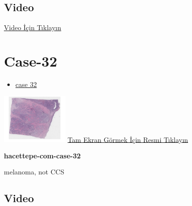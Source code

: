 \documentclass[
  letterpaper,
  DIV=11,
  numbers=noendperiod]{scrreprt}
\providecommand{\tightlist}{%
  \setlength{\itemsep}{0pt}\setlength{\parskip}{0pt}}\usepackage{longtable,booktabs,array}
\begin{document}
\hypertarget{video-29}{%
\subsection{Video}\label{video-29}}

\href{https://www.youtube.com/watch?v=KHM2yQkRIV8}{Video İçin Tıklayın}

\hypertarget{sec-hacettepe-case-of-the-month-case-32}{%
\section{Case-32}\label{sec-hacettepe-case-of-the-month-case-32}}

\begin{itemize}
\tightlist
\item
  \href{https://www.youtube.com/watch?v=mnLIi1sNnlQ\&ab_channel=KemalKosemehmetoglu}{case
  32}
\end{itemize}

\href{https://images.patolojiatlasi.com/hacettepe-com-case-32/HE.html}{\includegraphics[width=0.25\textwidth,height=\textheight]{./screenshots/hacettepe-com-case-32_screenshot.png}}
\href{https://images.patolojiatlasi.com/hacettepe-com-case-32/HE.html}{Tam
Ekran Görmek İçin Resmi Tıklayın}

\textbf{hacettepe-com-case-32}

\begin{tcolorbox}[enhanced jigsaw, left=2mm, toprule=.15mm, rightrule=.15mm, bottomrule=.15mm, leftrule=.75mm, colback=white, colframe=quarto-callout-tip-color-frame, toptitle=1mm, breakable, titlerule=0mm, colbacktitle=quarto-callout-tip-color!10!white, bottomtitle=1mm, title=\textcolor{quarto-callout-tip-color}{\faLightbulb}\hspace{0.5em}{Tanı}, arc=.35mm, opacitybacktitle=0.6, opacityback=0, coltitle=black]

melanoma, not CCS

\end{tcolorbox}

\hypertarget{video-30}{%
\subsection{Video}\label{video-30}}
\end{document}
